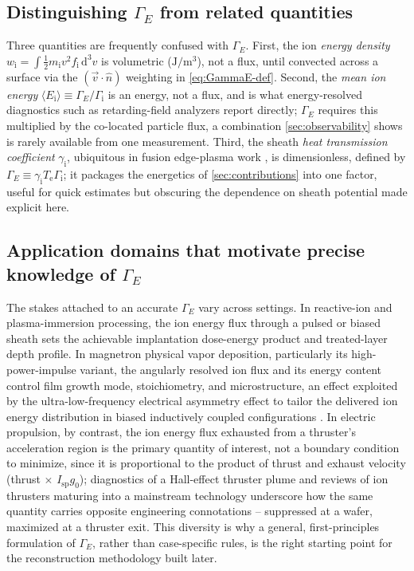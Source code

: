 \subsection{Distinguishing \texorpdfstring{$\Gamma_{E}$}{Gamma\_E} from related quantities}

Three quantities are frequently confused with $\Gamma_{E}$. First, the ion \emph{energy density} $w_{\mathrm{i}} = \int \tfrac12 m_{\mathrm{i}} v^2 f_{\mathrm{i}}\, \mathrm{d}^3 v$ is volumetric ($\si{\joule\per\cubic\meter}$), not a flux, until convected across a surface via the $(\vec v\cdot\hat n)$ weighting in \cref{eq:GammaE-def}. Second, the \emph{mean ion energy} $\langle E_{\mathrm{i}}\rangle \equiv \Gamma_{E}/\Gamma_{\mathrm{i}}$ is an energy, not a flux, and is what energy-resolved diagnostics such as retarding-field analyzers report directly; $\Gamma_{E}$ requires this multiplied by the co-located particle flux, a combination \cref{sec:observability} shows is rarely available from one measurement. Third, the sheath \emph{heat transmission coefficient} $\gamma_{\mathrm{i}}$, ubiquitous in fusion edge-plasma work \cite{ref0093}, is dimensionless, defined by $\Gamma_{E} \equiv \gamma_{\mathrm{i}} T_{\mathrm{e}} \Gamma_{\mathrm{i}}$; it packages the energetics of \cref{sec:contributions} into one factor, useful for quick estimates but obscuring the dependence on sheath potential made explicit here.

\subsection{Application domains that motivate precise knowledge of \texorpdfstring{$\Gamma_{E}$}{Gamma\_E}}

The stakes attached to an accurate $\Gamma_{E}$ vary across settings. In reactive-ion and plasma-immersion processing, the ion energy flux through a pulsed or biased sheath sets the achievable implantation dose-energy product and treated-layer depth profile. In magnetron physical vapor deposition, particularly its high-power-impulse variant, the angularly resolved ion flux and its energy content control film growth mode, stoichiometry, and microstructure, an effect exploited by the ultra-low-frequency electrical asymmetry effect to tailor the delivered ion energy distribution in biased inductively coupled configurations \cite{ref0106}. In electric propulsion, by contrast, the ion energy flux exhausted from a thruster's acceleration region is the primary quantity of interest, not a boundary condition to minimize, since it is proportional to the product of thrust and exhaust velocity (thrust $\times$ $I_{\mathrm{sp}} g_0$); diagnostics of a Hall-effect thruster plume \cite{ref0114} and reviews of ion thrusters maturing into a mainstream technology \cite{ref0115} underscore how the same quantity carries opposite engineering connotations -- suppressed at a wafer, maximized at a thruster exit. This diversity is why a general, first-principles formulation of $\Gamma_{E}$, rather than case-specific rules, is the right starting point for the reconstruction methodology built later.

